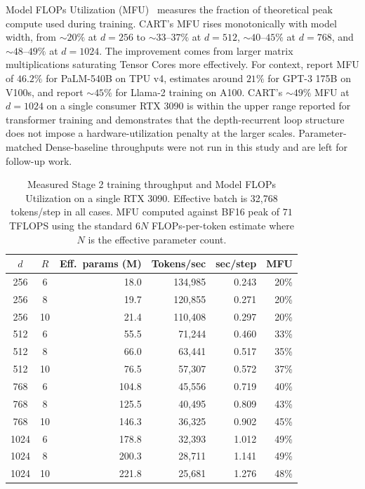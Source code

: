 \documentclass{article}
\newcommand{\cart}{\textsc{CART}}
\begin{document}
Model FLOPs Utilization (MFU)~\citep{chowdhery2023palm} measures the fraction of theoretical peak compute used during training. \cart{}'s MFU rises monotonically with model width, from $\sim 20\%$ at $d{=}256$ to $\sim 33$--$37\%$ at $d{=}512$, $\sim 40$--$45\%$ at $d{=}768$, and $\sim 48$--$49\%$ at $d{=}1024$. The improvement comes from larger matrix multiplications saturating Tensor Cores more effectively. For context, \citet{chowdhery2023palm} report MFU of $46.2\%$ for PaLM-540B on TPU v4, \citet{brown2020gpt3} estimates around $21\%$ for GPT-3 175B on V100s, and \citet{touvron2023llama} report $\sim 45\%$ for Llama-2 training on A100. \cart{}'s $\sim 49\%$ MFU at $d{=}1024$ on a single consumer RTX 3090 is within the upper range reported for transformer training and demonstrates that the depth-recurrent loop structure does not impose a hardware-utilization penalty at the larger scales. Parameter-matched Dense-baseline throughputs were not run in this study and are left for follow-up work.

\begin{table}[htbp]
\centering
\caption{Measured Stage 2 training throughput and Model FLOPs Utilization on a single RTX 3090. Effective batch is 32{,}768 tokens/step in all cases. MFU computed against BF16 peak of $71$ TFLOPS using the standard $6N$ FLOPs-per-token estimate where $N$ is the effective parameter count.}
\label{tab:throughput}
\footnotesize
\begin{tabular}{ccrrrr}
\toprule
$d$ & $R$ & Eff.\ params (M) & Tokens/sec & sec/step & MFU \\
\midrule
256  & 6  &  18.0 & 134{,}985 & 0.243 & 20\% \\
256  & 8  &  19.7 & 120{,}855 & 0.271 & 20\% \\
256  & 10 &  21.4 & 110{,}408 & 0.297 & 20\% \\
512  & 6  &  55.5 &  71{,}244 & 0.460 & 33\% \\
512  & 8  &  66.0 &  63{,}441 & 0.517 & 35\% \\
512  & 10 &  76.5 &  57{,}307 & 0.572 & 37\% \\
768  & 6  & 104.8 &  45{,}556 & 0.719 & 40\% \\
768  & 8  & 125.5 &  40{,}495 & 0.809 & 43\% \\
768  & 10 & 146.3 &  36{,}325 & 0.902 & 45\% \\
1024 & 6  & 178.8 &  32{,}393 & 1.012 & 49\% \\
1024 & 8  & 200.3 &  28{,}711 & 1.141 & 49\% \\
1024 & 10 & 221.8 &  25{,}681 & 1.276 & 48\% \\
\bottomrule
\end{tabular}
\end{table}
\end{document}
